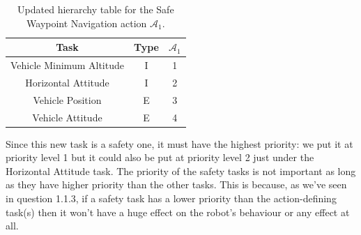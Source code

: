 \documentclass{article}
\begin{document}
\begin{table}[htb]
	\caption{Updated hierarchy table for the Safe Waypoint Navigation action $\mathcal{A}_{1}$.}
	\label{tb2:ex1.2.1SafeWaypointNavigationTable}
	\begin{center}
		\footnotesize
		\begin{tabular}{ccc}
			\toprule
			Task & Type & $\mathcal{A}_{1}$ \\
			\midrule
			Vehicle Minimum Altitude & I & 1 \\
			\hdashline
			Horizontal Attitude      & I & 2 \\
			\hdashline
			Vehicle Position 	     & E & 3 \\
			\hdashline
			Vehicle Attitude         & E & 4 \\
			\bottomrule
		\end{tabular}
	\end{center}
\end{table}

Since this new task is a safety one, it must have the highest priority: we put it at priority level 1 but it could also be put at priority level 2 just under the Horizontal Attitude task. The priority of the safety tasks is not important as long as they have higher priority than the other tasks. This is because, as we've seen in question 1.1.3, if a safety task has a lower priority than the action-defining task(s) then it won't have a huge effect on the robot's behaviour or any effect at all.
\end{document}
